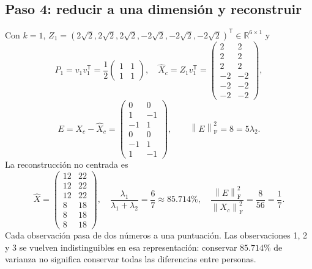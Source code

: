 \documentclass[11pt,a4paper]{article}
\newcommand{\R}{\mathbb R}
\newcommand{\T}{^{\mathsf T}}
\newcommand{\norm}[1]{\left\lVert #1\right\rVert}
\newcommand{\F}{_{\mathrm F}}
\theoremstyle{definition}
\begin{document}
\subsection{Paso 4: reducir a una dimensión y reconstruir}
Con $k=1$, $Z_1=(2\sqrt2,2\sqrt2,2\sqrt2,-2\sqrt2,-2\sqrt2,-2\sqrt2)\T\in\R^{6\times1}$ y
\[
P_1=v_1v_1\T=\frac12\begin{pmatrix}1&1\\1&1\end{pmatrix},\quad
\widehat X_c=Z_1v_1\T=\begin{pmatrix}2&2\\2&2\\2&2\\-2&-2\\-2&-2\\-2&-2\end{pmatrix},
\]
\[
E=X_c-\widehat X_c=\begin{pmatrix}0&0\\1&-1\\-1&1\\0&0\\-1&1\\1&-1\end{pmatrix},\qquad
\norm E\F^2=8=5\lambda_2.
\]
La reconstrucción no centrada es
\[
\widehat X=\begin{pmatrix}12&22\\12&22\\12&22\\8&18\\8&18\\8&18\end{pmatrix},\quad
\frac{\lambda_1}{\lambda_1+\lambda_2}=\frac67\approx85.714\%,\quad
\frac{\norm E\F^2}{\norm{X_c}\F^2}=\frac8{56}=\frac17.
\]
Cada observación pasa de dos números a una puntuación. Las observaciones 1, 2 y 3 se vuelven indistinguibles en esa representación: conservar $85.714\%$ de varianza no significa conservar todas las diferencias entre personas.
\end{document}
